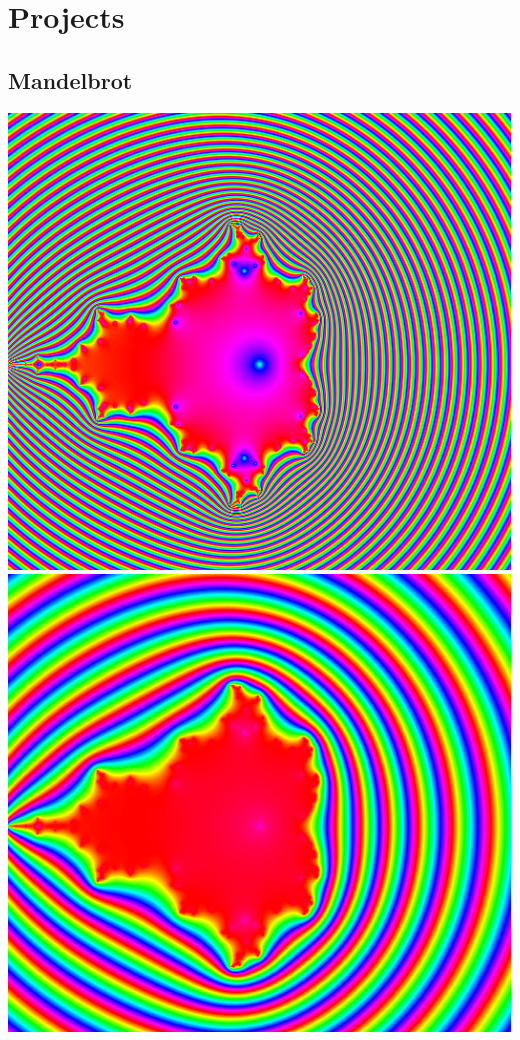 \documentclass[../resume.tex]{subfiles}
\begin{document}
\section{Projects}

\subsection{Mandelbrot}

\noindent
\includegraphics[scale=0.15]{../TAing/mandel/1.png} 
\includegraphics[scale=0.15]{../TAing/mandel/2.png}
\end{document}
